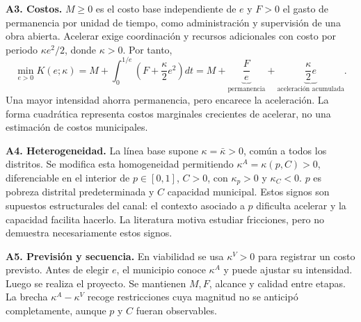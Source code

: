 \documentclass[11pt,a4paper]{article}
\begin{document}
\textbf{A3. Costos.} $M\geq0$ es el costo base independiente de $e$ y $F>0$ el gasto de permanencia por unidad de tiempo, como administración y supervisión de una obra abierta. Acelerar exige coordinación y recursos adicionales con costo por periodo $\kappa e^2/2$, donde $\kappa>0$. Por tanto,
\begin{equation}
\min_{e>0} K(e;\kappa)
=M+\int_0^{1/e}\left(F+\frac{\kappa}{2}e^2\right)dt
=M+\underbrace{\frac{F}{e}}_{\text{permanencia}}+
\underbrace{\frac{\kappa}{2}e}_{\text{aceleración acumulada}}.
\label{eq:problem}
\end{equation}
Una mayor intensidad ahorra permanencia, pero encarece la aceleración. La forma cuadrática representa costos marginales crecientes de acelerar, no una estimación de costos municipales.

\textbf{A4. Heterogeneidad.} La línea base supone $\kappa=\bar\kappa>0$, común a todos los distritos. Se modifica esta homogeneidad permitiendo $\kappa^A=\kappa(p,C)>0$, diferenciable en el interior de $p\in[0,1]$, $C>0$, con $\kappa_p>0$ y $\kappa_C<0$. $p$ es pobreza distrital predeterminada y $C$ capacidad municipal. Estos signos son supuestos estructurales del canal: el contexto asociado a $p$ dificulta acelerar y la capacidad facilita hacerlo. La literatura motiva estudiar fricciones, pero no demuestra necesariamente estos signos.

\textbf{A5. Previsión y secuencia.} En viabilidad se usa $\kappa^V>0$ para registrar un costo previsto. Antes de elegir $e$, el municipio conoce $\kappa^A$ y puede ajustar su intensidad. Luego se realiza el proyecto. Se mantienen $M,F$, alcance y calidad entre etapas. La brecha $\kappa^A-\kappa^V$ recoge restricciones cuya magnitud no se anticipó completamente, aunque $p$ y $C$ fueran observables.
\newpage
\end{document}
